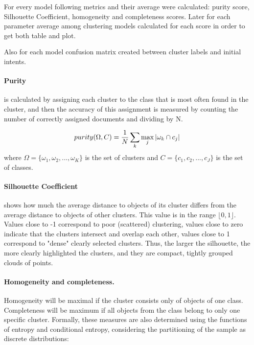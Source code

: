 \documentclass[11pt]{article}
\begin{document}
For every model following metrics and their average were calculated: purity score, Silhouette Coefficient, homogeneity and completeness scores. Later for each parameter average among clustering models calculated for each score in order to get both table and plot.

Also for each model confusion matrix created between cluster labels and initial intents.

\paragraph{Purity} is calculated by assigning each cluster to the class that is most often found in the cluster, and then the accuracy of this assignment is measured by counting the number of correctly assigned documents and dividing by N.

\begin{equation}
\centering
purity(\Omega,C) =\frac{1}{N} \sum_{k} \max_{j}|\omega_{k}\cap c_{j}|
\end{equation}
where $\Omega=\{\omega_{1}, \omega_{2}, ... ,\omega_{K}\}$ is the set of clusters and $C = \{c_{1}, c_{2}, ... , c_{J}\}$ is the set of classes. 

\paragraph{Silhouette Coefficient} shows how much the average distance to objects of its cluster differs from the average distance to objects of other clusters. This value is in the range $\lfloor 0, 1\rfloor$. Values close to -1 correspond to poor (scattered) clustering, values close to zero indicate that the clusters intersect and overlap each other, values close to 1 correspond to "dense" clearly selected clusters. Thus, the larger the silhouette, the more clearly highlighted the clusters, and they are compact, tightly grouped clouds of points.

\paragraph{Homogeneity and completeness.} Homogeneity will be maximal if the cluster consists only of objects of one class. Completeness will be maximum if all objects from the class belong to only one specific cluster.
Formally, these measures are also determined using the functions of entropy and conditional entropy, considering the partitioning of the sample as discrete distributions:
\end{document}
